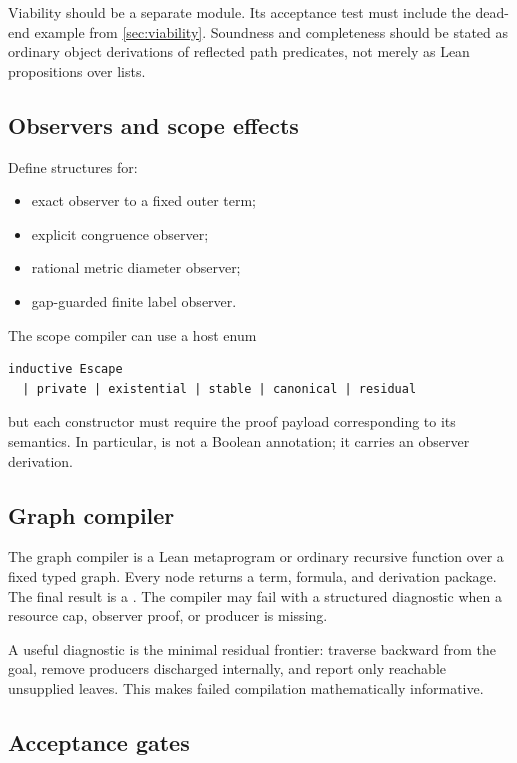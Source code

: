 Viability should be a separate module.  Its acceptance test must include the dead-end example from \cref{sec:viability}.  Soundness and completeness should be stated as ordinary object derivations of reflected path predicates, not merely as Lean propositions over lists.

\subsection{Observers and scope effects}

Define structures for:

\begin{itemize}
\item exact observer to a fixed outer term;
\item explicit congruence observer;
\item rational metric diameter observer;
\item gap-guarded finite label observer.
\end{itemize}

The scope compiler can use a host enum
\begin{lstlisting}
inductive Escape
  | private | existential | stable | canonical | residual
\end{lstlisting}
but each constructor must require the proof payload corresponding to its semantics.  In particular,  is not a Boolean annotation; it carries an observer derivation.

\subsection{Graph compiler}

The graph compiler is a Lean metaprogram or ordinary recursive function over a fixed typed graph.  Every node returns a term, formula, and derivation package.  The final result is a .  The compiler may fail with a structured diagnostic when a resource cap, observer proof, or producer is missing.

A useful diagnostic is the minimal residual frontier: traverse backward from the goal, remove producers discharged internally, and report only reachable unsupplied leaves.  This makes failed compilation mathematically informative.

\subsection{Acceptance gates}

